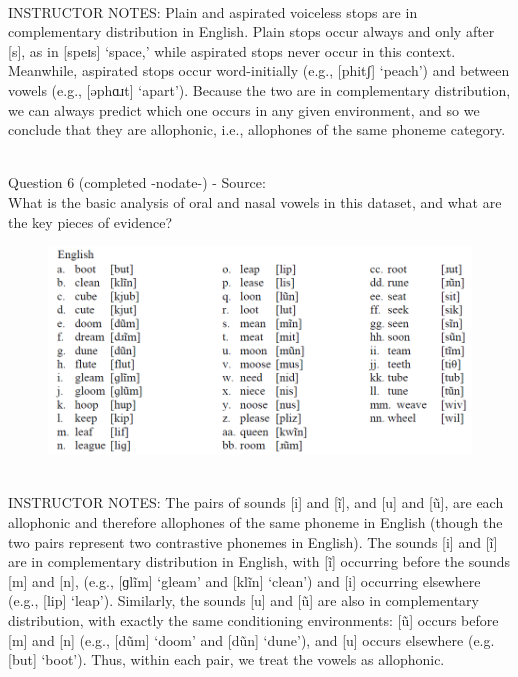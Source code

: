 \documentclass[12pt]{article}
\begin{document}
~\\
INSTRUCTOR NOTES: Plain and aspirated voiceless stops are in complementary distribution in English. Plain stops occur always and only after [s], as in [speɪs] ‘space,’ while aspirated stops never occur in this context. Meanwhile, aspirated stops occur word-initially (e.g., [phitʃ] ‘peach’) and between vowels (e.g., [əphɑɹt] ‘apart’). Because the two are in complementary distribution, we can always predict which one occurs in any given environment, and so we conclude that they are allophonic, i.e., allophones of the same phoneme category. 


~\\

{\large Question 6} (completed -nodate-) - Source: \\

What is the basic analysis of oral and nasal vowels in this dataset, and what are the key pieces of evidence?\\

\begin{figure}[H]
\includegraphics{../images/english12.png}
\end{figure}

~\\
INSTRUCTOR NOTES: The pairs of sounds [i] and [ĩ], and [u] and [ũ], are each allophonic and therefore allophones of the same phoneme in English (though the two pairs represent two contrastive phonemes in English). The sounds [i] and [ĩ] are in complementary distribution in English, with [ĩ] occurring before the sounds [m] and [n], (e.g., [ɡlĩm] ‘gleam’ and [klĩn] ‘clean’) and [i] occurring elsewhere (e.g., [lip] ‘leap’). Similarly, the sounds [u] and [ũ] are also in complementary distribution, with exactly the same conditioning environments: [ũ] occurs before [m] and [n] (e.g., [dũm] ‘doom’ and [dũn] ‘dune’), and [u] occurs elsewhere (e.g. [but] ‘boot’). Thus, within each pair, we treat the vowels as allophonic. 
\end{document}
